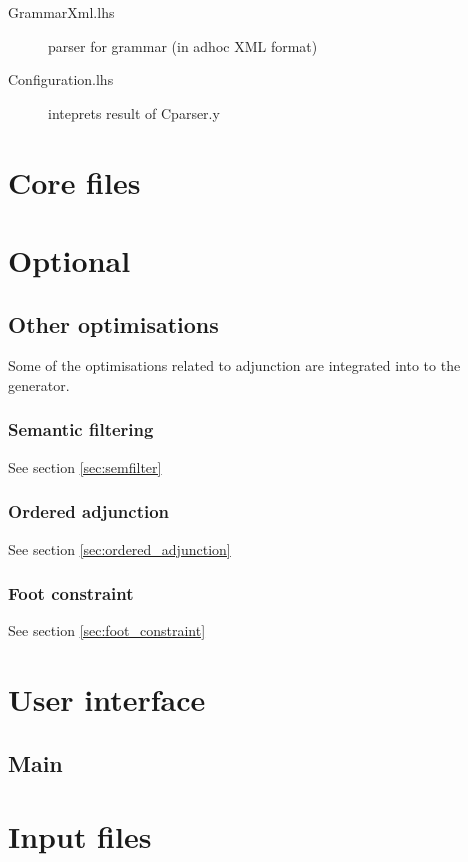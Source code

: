 \documentclass[11pt]{report}
\begin{document}
\begin{description}
 \item[GrammarXml.lhs] parser for grammar (in adhoc XML format)
 \item[Configuration.lhs] inteprets result of Cparser.y
\end{description}



\part{Core files}

       
       
       
       
       

\part{Optional}

       
       
% 

\chapter{Other optimisations}
\label{chp:other_optimisations}

Some of the optimisations related to adjunction are integrated into
to the generator.

\section{Semantic filtering}

See section \ref{sec:semfilter}

\section{Ordered adjunction}

See section \ref{sec:ordered_adjunction}

\section{Foot constraint}

See section \ref{sec:foot_constraint}

\part{User interface}

\chapter{Main}







\part{Input files}




\end{document}
